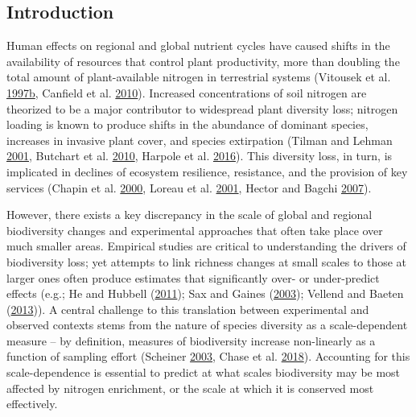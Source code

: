 \documentclass[twoside,12pt,final]{ucthesis-CA2012}
\begin{document}
\begin{ucmainmatter}
\hypertarget{introduction}{%
\section{Introduction}\label{introduction}}

Human effects on regional and global nutrient cycles have caused shifts in the availability of resources that control plant productivity, more than doubling the total amount of plant-available nitrogen in terrestrial systems (Vitousek et al. \protect\hyperlink{ref-Vitousek1997}{1997}\protect\hyperlink{ref-Vitousek1997}{b}, Canfield et al. \protect\hyperlink{ref-canfield2010}{2010}). Increased concentrations of soil nitrogen are theorized to be a major contributor to widespread plant diversity loss; nitrogen loading is known to produce shifts in the abundance of dominant species, increases in invasive plant cover, and species extirpation (Tilman and Lehman \protect\hyperlink{ref-Tilman2001}{2001}, Butchart et al. \protect\hyperlink{ref-butchart2010}{2010}, Harpole et al. \protect\hyperlink{ref-Harpole2016}{2016}). This diversity loss, in turn, is implicated in declines of ecosystem resilience, resistance, and the provision of key services (Chapin et al. \protect\hyperlink{ref-Chapin2000}{2000}, Loreau et al. \protect\hyperlink{ref-loreau2001}{2001}, Hector and Bagchi \protect\hyperlink{ref-Hector2007}{2007}).

However, there exists a key discrepancy in the scale of global and regional biodiversity changes and experimental approaches that often take place over much smaller areas. Empirical studies are critical to understanding the drivers of biodiversity loss; yet attempts to link richness changes at small scales to those at larger ones often produce estimates that significantly over- or under-predict effects (e.g.; He and Hubbell (\protect\hyperlink{ref-he2011}{2011}); Sax and Gaines (\protect\hyperlink{ref-sax2003}{2003}); Vellend and Baeten (\protect\hyperlink{ref-vellend2013}{2013})). A central challenge to this translation between experimental and observed contexts stems from the nature of species diversity as a scale-dependent measure -- by definition, measures of biodiversity increase non-linearly as a function of sampling effort (Scheiner \protect\hyperlink{ref-scheiner2003}{2003}, Chase et al. \protect\hyperlink{ref-chase2018}{2018}). Accounting for this scale-dependence is essential to predict at what scales biodiversity may be most affected by nitrogen enrichment, or the scale at which it is conserved most effectively.


\end{ucmainmatter}
\end{document}
